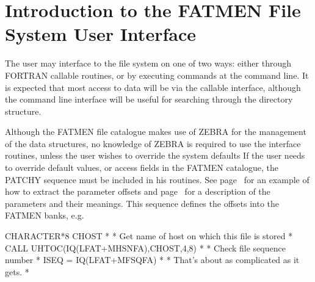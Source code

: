 
\chapter{Introduction to the FATMEN File System User Interface}

The user may interface to the file system on one of two ways:
either through FORTRAN callable routines, or by executing commands
at the command line.
It is expected that most access to data
will be via the callable interface, although the command line
interface will be useful for searching through the directory structure.
\par
{}
Although the FATMEN file catalogue makes use of ZEBRA for the management
of the data structures, no knowledge of ZEBRA is required to use
the interface routines, unless the user wishes
to override the system defaults
If the user
needs to override default values, or access fields in the FATMEN
catalogue, the PATCHY sequence  must be included in his routines.
See page~\pageref{EXTRACT-FATPARA} for an example of how to extract
the parameter offsets and page~\pageref{BANK-OFFSETS} for a description of
the parameters and their meanings.
This sequence defines the offsets into the FATMEN banks, e.g.
\begin{XMP}
      CHARACTER*8 CHOST
*
*     Get name of host on which this file is stored
*
      CALL UHTOC(IQ(LFAT+MHSNFA),CHOST,4,8)
*
*     Check file sequence number
*
      ISEQ = IQ(LFAT+MFSQFA)
*
*     That's about as complicated as it gets.
*
\end{XMP}
